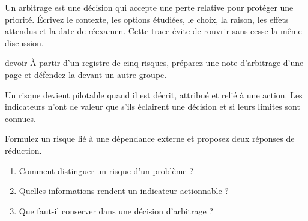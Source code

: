 \documentclass[12pt,twoside]{upbcours}
\begin{document}
Un arbitrage est une décision qui accepte une perte relative pour protéger une priorité. Écrivez
le contexte, les options étudiées, le choix, la raison, les effets attendus et la date de réexamen.
Cette trace évite de rouvrir sans cesse la même discussion.
\begin{icone}{devoir}
  À partir d'un registre de cinq risques, préparez une note d'arbitrage d'une page et défendez-la
  devant un autre groupe.
\end{icone}
\begin{resumechapitre}
  Un risque devient pilotable quand il est décrit, attribué et relié à une action. Les indicateurs
  n'ont de valeur que s'ils éclairent une décision et si leurs limites sont connues.
\end{resumechapitre}
\begin{evalformative}
  Formulez un risque lié à une dépendance externe et proposez deux réponses de réduction.
\end{evalformative}
\begin{autoevaluation}
  \begin{enumerate}
    \item Comment distinguer un risque d'un problème ?
    \item Quelles informations rendent un indicateur actionnable ?
    \item Que faut-il conserver dans une décision d'arbitrage ?
  \end{enumerate}
\end{autoevaluation}
\end{document}
